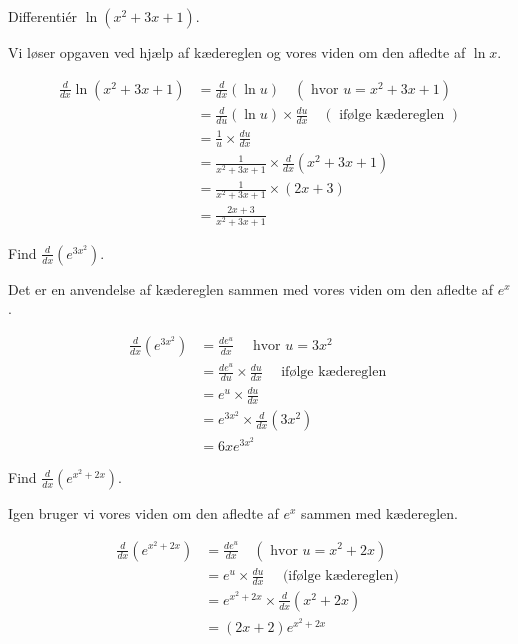 \begin{example}

    Differentiér \(\ln \left(x^2+3 x+1\right)\).
\end{example}

\begin{solution} Vi løser opgaven ved hjælp af kædereglen og vores viden om den afledte af \(\ln x\).

    \[
    \begin{aligned}
    \frac{d}{d x} \ln\left(x^2+3 x+1\right) & =\frac{d}{d x}\left(\ln u\right) \quad\left(\text { hvor } u=x^2+3 x+1\right) \\
    & =\frac{d}{d u}\left(\ln u\right) \times \frac{d u}{d x} \quad(\text { ifølge kædereglen }) \\
    & =\frac{1}{u} \times \frac{d u}{d x} \\
    & =\frac{1}{x^2+3 x+1} \times \frac{d}{d x}\left(x^2+3 x+1\right) \\
    & =\frac{1}{x^2+3 x+1} \times(2 x+3) \\
    & =\frac{2 x+3}{x^2+3 x+1}
    \end{aligned}
    \]

\end{solution}


\begin{example}
    
Find \(\frac{d}{d x}\left(e^{3 x^2}\right)\).
\end{example}
\begin{solution} Det er en anvendelse af kædereglen sammen med vores viden om den afledte af \(e^x\).

\[
\begin{aligned}
\frac{d}{d x}\left(e^{3 x^2}\right) & =\frac{d e^u}{d x} \quad \text { hvor } u=3 x^2 \\
& =\frac{d e^u}{d u} \times \frac{d u}{d x} \quad \text { ifølge kædereglen } \\
& =e^u \times \frac{d u}{d x} \\
& =e^{3 x^2} \times \frac{d}{d x}\left(3 x^2\right) \\
& =6 x e^{3 x^2}
\end{aligned}
\]
\end{solution}


\begin{example}

Find \(\frac{d}{d x}\left(e^{x^2+2 x}\right)\).
\end{example}
\begin{solution} Igen bruger vi vores viden om den afledte af \(e^x\) sammen med kædereglen.

\[
\begin{aligned}
\frac{d}{d x}\left(e^{x^2+2 x}\right) & =\frac{d e^{u}}{d x} \quad\left(\text { hvor } u=x^2+2 x\right) \\
& =e^{u} \times \frac{d u}{d x} \quad \text { (ifølge kædereglen) } \\
& =e^{x^2+2 x} \times \frac{d}{d x}\left(x^2+2 x\right) \\
& =\left(2x+2\right)e^{x^2+2 x}
\end{aligned}
\]
\end{solution}


